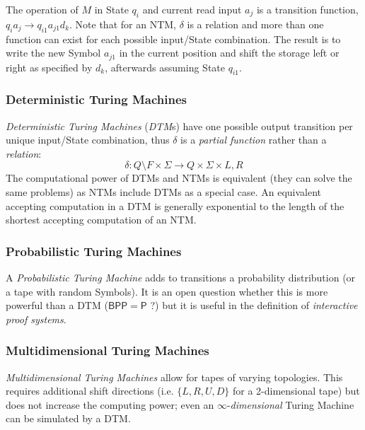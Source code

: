 The operation of $M$ in State $q_i$ and current read input $a_j$ is a
transition function, $q_i a_j \rightarrow q_{i1} a_{j1} d_k$. Note
that for an NTM, $\delta$ is a relation and more than one function can
exist for each possible input/State combination. The result is to
write the new Symbol $a_{j1}$ in the current position and shift the
storage left or right as specified by $d_k$, afterwards assuming State
$q_{i1}$.



\subsubsection{Deterministic Turing Machines}

\emph{Deterministic Turing Machines} (\emph{DTM}s) have one possible
output transition per unique input/State combination, thus $\delta$ is
a \emph{partial function} rather than a \emph{relation}:
\[
    \delta : Q \setminus F \times \Sigma \rightarrow Q \times
    \Sigma \times {L,R}
\]
The computational power of DTMs and NTMs is equivalent (they can solve
the same problems) as NTMs include DTMs as a special case. An
equivalent accepting computation in a DTM is generally exponential to
the length of the shortest accepting computation of an NTM.



\subsubsection{Probabilistic Turing Machines}

A \emph{Probabilistic Turing Machine} adds to transitions a
probability distribution (or a tape with random Symbols). It is an
open question whether this is more powerful than a DTM
($\mathsf{BPP}=\mathsf{P}$ ?)  but it is useful in the definition of
\emph{interactive proof systems}. %



\subsubsection{Multidimensional Turing Machines}

\emph{Multidimensional Turing Machines} allow for tapes of varying
topologies. This requires additional shift directions (i.e. $\{L, R, U,
D\}$ for a 2-dimensional tape) but does not increase the computing
power; even an $\infty$-\emph{dimensional} Turing Machine can be
simulated by a DTM.



